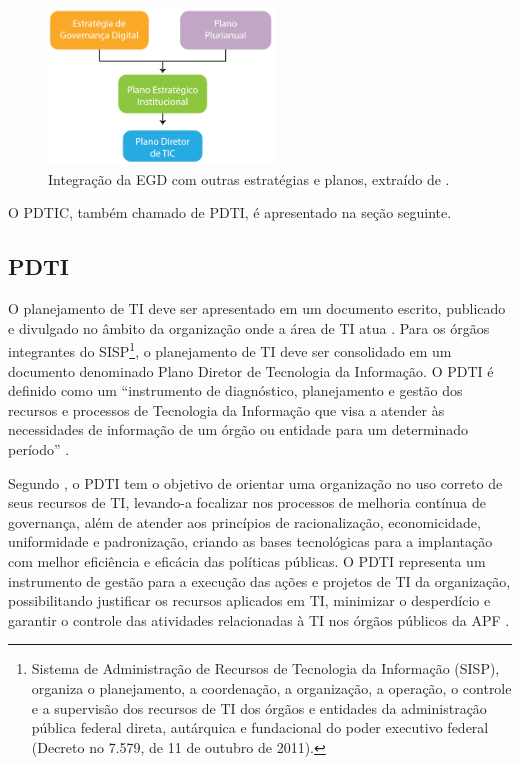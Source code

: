\begin{figure}[h]
\centering %
\includegraphics[width=6cm]{figuras/EGDalinhaPDTIC.png}
\caption{Integração da EGD com outras estratégias e planos, extraído de \cite{egd:16}.}
\label{figura:EGDalinhaPDTIC}
\end{figure}

O PDTIC, também chamado de PDTI, é apresentado na seção seguinte.

\subsection{PDTI}
O planejamento de TI deve ser apresentado em um documento escrito, publicado e divulgado no âmbito da organização onde a área de TI atua \cite{sisp:12}. Para os órgãos integrantes do SISP\footnote{Sistema de Administração de Recursos de Tecnologia da Informação (SISP), organiza o planejamento, a coordenação, a organização, a operação, o controle e a supervisão dos recursos de TI dos órgãos e entidades da administração pública federal direta, autárquica e fundacional do poder executivo federal (Decreto no 7.579, de 11 de outubro de 2011).}, o planejamento de TI deve ser consolidado em um documento denominado Plano Diretor de Tecnologia da Informação. O PDTI é definido como um ``instrumento de diagnóstico, planejamento e gestão dos recursos e processos de Tecnologia da Informação que visa a atender às necessidades de informação de um órgão ou entidade para um determinado período'' \cite{in04:08,in04:10,in04:14}.

Segundo , o PDTI tem o objetivo de orientar uma organização no uso correto de seus recursos de TI, levando-a
focalizar nos processos de melhoria contínua de governança, além de atender aos princípios de racionalização, economicidade, uniformidade e padronização, criando as bases tecnológicas para a implantação com melhor eficiência e eficácia das políticas públicas. O PDTI representa um instrumento de gestão para a execução das ações e projetos de TI da organização, possibilitando justificar os recursos aplicados em TI, minimizar o desperdício e garantir o controle das atividades relacionadas à TI nos órgãos públicos da APF \cite{sisp:15}.

